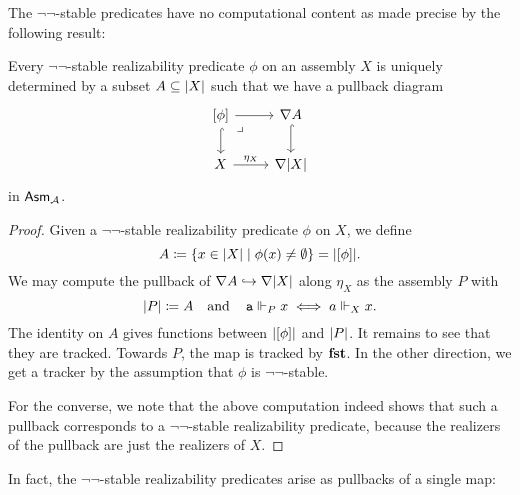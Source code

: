 The \(\lnot\lnot\)-stable predicates have no computational content as made
precise by the following result:

\begin{proposition}\label{not-not-stable-ordinary-subsets}
  Every \(\lnot\lnot\)-stable realizability predicate \(\phi\) on an
  assembly \(X\) is uniquely determined by a subset \(A \subseteq \lvert X\rvert\)
  such that we have a pullback diagram
  \[
    \begin{tikzcd}
      {[\phi]} \ar[r] \ar[d,hookrightarrow] \pbcorner
      & \nabla A \ar[d,hookrightarrow] \\
      X \ar[r,"\eta_X"] & \nabla\carrier{X}
    \end{tikzcd}
  \]
  in \(\mathsf{Asm}_{\mathcal A}\).%
\end{proposition}
\begin{proof}
  Given a \(\lnot\lnot\)-stable realizability predicate \(\phi\) on \(X\), we
  define
  \[
    A \coloneqq \{x \in \lvert X\rvert \mid \phi(x) \neq \emptyset\} = \lvert[\phi]\rvert.
  \]
  We may compute the pullback of \(\nabla A \hookrightarrow \nabla\lvert X\rvert\)
  along \(\eta_X\) as the assembly \(P\) with
  \[
    \lvert P\rvert \coloneqq A \quad\text{and}\quad
    \operatorname{\mathtt{a}} \Vdash_P x \iff a \Vdash_X x.
  \]
  The identity on \(A\) gives functions between \(\lvert[\phi]\rvert\) and
  \(\lvert P\rvert\). It remains to see that they are tracked.
  Towards \(P\), the map is tracked by \(\operatorname{\mathbf{fst}}\). In the other direction, we
  get a tracker by the assumption that \(\phi\) is \(\lnot\lnot\)-stable.

  For the converse, we note that the above computation indeed shows that such a
  pullback corresponds to a \(\lnot\lnot\)-stable realizability predicate,
  because the realizers of the pullback are just the realizers of \(X\).
\end{proof}


In fact, the \(\lnot\lnot\)-stable realizability predicates arise as pullbacks
of a single map:

